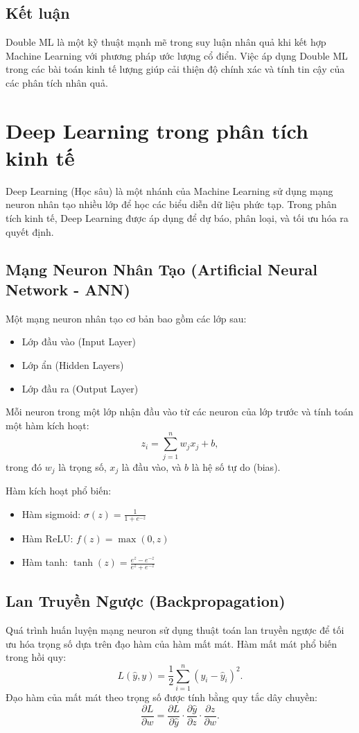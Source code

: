 \subsection{Kết luận}
Double ML là một kỹ thuật mạnh mẽ trong suy luận nhân quả khi kết hợp Machine Learning với phương pháp ước lượng cổ điển. Việc áp dụng Double ML trong các bài toán kinh tế lượng giúp cải thiện độ chính xác và tính tin cậy của các phân tích nhân quả.




\section{Deep Learning trong phân tích kinh tế}
Deep Learning (Học sâu) là một nhánh của Machine Learning sử dụng mạng neuron nhân tạo nhiều lớp để học các biểu diễn dữ liệu phức tạp. Trong phân tích kinh tế, Deep Learning được áp dụng để dự báo, phân loại, và tối ưu hóa ra quyết định.

\subsection{Mạng Neuron Nhân Tạo (Artificial Neural Network - ANN)}
Một mạng neuron nhân tạo cơ bản bao gồm các lớp sau:
\begin{itemize}
    \item Lớp đầu vào (Input Layer)
    \item Lớp ẩn (Hidden Layers)
    \item Lớp đầu ra (Output Layer)
\end{itemize}
Mỗi neuron trong một lớp nhận đầu vào từ các neuron của lớp trước và tính toán một hàm kích hoạt:
\begin{equation}
    z_i = \sum_{j=1}^{n} w_j x_j + b,
\end{equation}
trong đó $w_j$ là trọng số, $x_j$ là đầu vào, và $b$ là hệ số tự do (bias).

Hàm kích hoạt phổ biến:
\begin{itemize}
    \item Hàm sigmoid: $\sigma(z) = \frac{1}{1 + e^{-z}}$
    \item Hàm ReLU: $f(z) = \max(0, z)$
    \item Hàm tanh: $\tanh(z) = \frac{e^z - e^{-z}}{e^z + e^{-z}}$
\end{itemize}

\subsection{Lan Truyền Ngược (Backpropagation)}
Quá trình huấn luyện mạng neuron sử dụng thuật toán lan truyền ngược để tối ưu hóa trọng số dựa trên đạo hàm của hàm mất mát.
Hàm mất mát phổ biến trong hồi quy:
\begin{equation}
    L(\hat{y}, y) = \frac{1}{2} \sum_{i=1}^{n} (y_i - \hat{y}_i)^2.
\end{equation}
Đạo hàm của mất mát theo trọng số được tính bằng quy tắc dây chuyền:
\begin{equation}
    \frac{\partial L}{\partial w} = \frac{\partial L}{\partial \hat{y}} \cdot \frac{\partial \hat{y}}{\partial z} \cdot \frac{\partial z}{\partial w}.
\end{equation}

